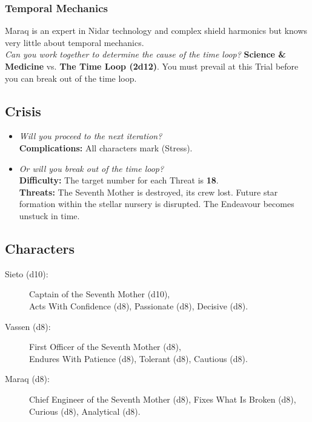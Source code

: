 \documentclass[11pt, a5paper, parskip=half-, DIV=12]{scrartcl}
\begin{document}
\subsubsection*{Temporal Mechanics}
Maraq is an expert in Nidar technology and complex shield harmonics but knows very little about temporal mechanics.
\\ \textit{Can you work together to determine the cause of the time loop?} \textbf{Science \& Medicine} vs. \textbf{The Time Loop (2d12)}. You must prevail at this Trial before you can break out of the time loop.

\subsection*{Crisis}
\begin{itemize}
	\item \textit{Will you proceed to the next iteration?} \\ \textbf{Complications:} All characters mark  (Stress). 
	\item \textit{Or will you break out of the time loop?} \\ \textbf{Difficulty:} The target number for each Threat is \textbf{18}. \\ \textbf{Threats:} The Seventh Mother is destroyed, its crew lost. Future star formation within the stellar nursery is disrupted. The Endeavour becomes unstuck in time.
\end{itemize}
\newpage

\subsection*{Characters}
\begin{description}
	\item[Sieto (d10):] Captain of the Seventh Mother (d10), \\ Acts With Confidence (d8), Passionate (d8), Decisive (d8).
	\item[Vassen (d8):] First Officer of the Seventh Mother (d8), \\ Endures With Patience (d8), Tolerant (d8),  Cautious (d8).
	\item[Maraq (d8):] Chief Engineer of the Seventh Mother  (d8), Fixes What Is Broken (d8), Curious (d8), Analytical (d8).
\end{description}
\end{document}
